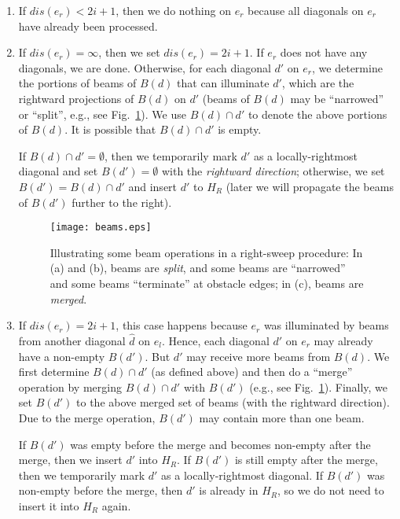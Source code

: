 \documentclass[english,runningheads,11pt]{llncs-revised}
\def\hatd{\hat{d}}
\begin{document}
\begin{enumerate}
\item
If $dis(e_r)<2i+1$, then we do nothing on $e_r$ because all diagonals on $e_r$ have already
been processed.

\item
If $dis(e_r)=\infty$,
then we set $dis(e_r)=2i+1$. If $e_r$ does not have any diagonals,
we are done. Otherwise, for each diagonal
$d'$ on $e_r$, we determine the portions of beams of $B(d)$ that can
illuminate $d'$, which are the rightward projections of $B(d)$ on
$d'$ (beams of $B(d)$ may be ``narrowed'' or ``split'', e.g., see Fig.~\ref{fig:beams}). We use
$B(d)\cap d'$ to denote the above portions of $B(d)$. It is
possible that $B(d)\cap d'$ is empty.

If $B(d)\cap d'=\emptyset$, then we temporarily mark $d'$ as a locally-rightmost diagonal
and set $B(d')=\emptyset$ with the {\em rightward
direction}; otherwise, we set $B(d')=B(d)\cap d'$ and insert $d'$ to
$H_R$ (later we will propagate the beams of $B(d')$ further to the
right).


\begin{figure}[t]
\begin{minipage}[t]{\linewidth}
\begin{center}
\texttt{[image: beams.eps]}
\caption{\footnotesize Illustrating some beam operations in a right-sweep procedure: In (a) and (b), beams are {\em split}, and some beams are ``narrowed'' and some beams ``terminate'' at obstacle edges; in (c), beams are {\em merged}.}
\label{fig:beams}
\end{center}
\end{minipage}
\vspace{-0.15in}
\end{figure}


\item
If $dis(e_r)=2i+1$, this case happens because $e_r$
was illuminated by beams from another diagonal $\hatd$ on $e_l$.
Hence, each diagonal $d'$ on
$e_r$ may already have a non-empty $B(d')$. But $d'$ may receive
more beams from $B(d)$. We first determine $B(d)\cap d'$ (as defined
above) and then
do a ``merge'' operation by merging $B(d)\cap d'$ with $B(d')$ (e.g., see Fig.~\ref{fig:beams}).
Finally, we set $B(d')$ to the above merged set of beams (with the
rightward direction). Due to the merge operation,
$B(d')$ may contain more than one beam.

If $B(d')$ was empty before the merge and becomes non-empty after the
merge, then we insert $d'$ into $H_R$. If $B(d')$ is still empty after
the merge, then we temporarily mark $d'$ as a locally-rightmost diagonal.
If $B(d')$ was non-empty before the merge, then $d'$ is already in
$H_R$, so we do not need to insert it into $H_R$ again.
\end{enumerate}
\end{document}
